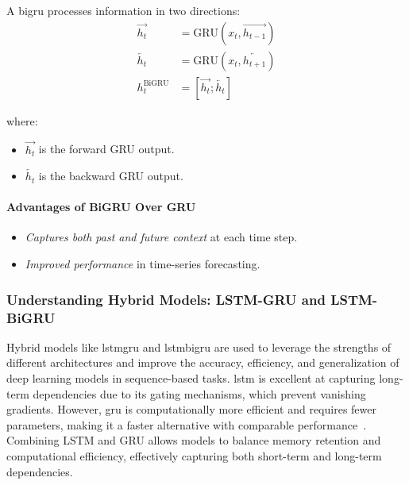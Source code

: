 A \acrshort{bigru} processes information in two directions:
\begin{align}
\overrightarrow{h_t} &= \text{GRU}(x_t, \overrightarrow{h_{t-1}}) \\
\overleftarrow{h_t} &= \text{GRU}(x_t, \overleftarrow{h_{t+1}}) \\
h_t^{\text{BiGRU}} &= [\overrightarrow{h_t}; \overleftarrow{h_t}]
\end{align}

where:
\begin{itemize}
\item $\overrightarrow{h_t}$ is the forward GRU output.
\item $\overleftarrow{h_t}$ is the backward GRU output.
\end{itemize}

\paragraph{Advantages of BiGRU Over GRU}

\begin{itemize}
\item \emph{Captures both past and future context} at each time step.
\item \emph{Improved performance} in time-series forecasting.
\end{itemize}

\subsubsection{Understanding Hybrid Models: LSTM-GRU and LSTM-BiGRU}

Hybrid models like \acrshort{lstmgru} and \acrshort{lstmbigru} are used to leverage the strengths of
different architectures and improve the 
accuracy, efficiency, and generalization of deep learning models in sequence-based tasks. \acrshort{lstm} is excellent at 
capturing long-term dependencies due to its gating mechanisms, which prevent vanishing gradients. However, \acrshort{gru} 
is computationally more efficient and requires fewer parameters, making it a faster alternative with comparable 
performance~\parencite{phuoc2024StockPrediction}. Combining LSTM and GRU allows models to balance memory retention and computational
efficiency, effectively capturing both short-term and long-term dependencies.


